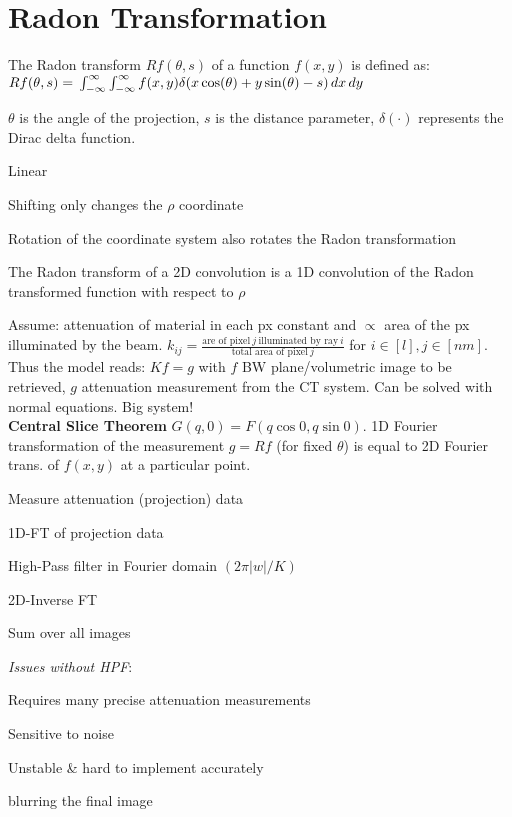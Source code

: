 \section{Radon Transformation}
The Radon transform $Rf(\theta, s)$ of a function $f(x, y)$ is defined as:\\
$
Rf(\theta, s) =\\
\int_{-\infty}^{\infty} \int_{-\infty}^{\infty} f(x, y) \delta(x\cos(\theta) + y\sin(\theta) - s) \,dx\,dy$

 $\theta$ is the angle of the projection, $ s $ is the distance parameter,
 $ \delta(\cdot) $ represents the Dirac delta function.


\begin{compactitem}
    \item Linear
    \item Shifting only changes the \(\rho\) coordinate
    \item Rotation of the coordinate system also rotates the Radon transformation
    \item The Radon transform of a 2D convolution is a 1D convolution of the Radon transformed function with respect to \(\rho\)
\end{compactitem}


  Assume: attenuation of material in each px constant and \(\propto\) area of the px illuminated by the beam.
  \(k_{ij} = \frac{\text{are of pixel} \ j \ \text{illuminated by ray} \ i}{\text{total area of pixel} \ j}\) for \(i \in [l], j \in [nm]\). Thus the model reads:
  \(Kf = g\) with \(f\) BW plane/volumetric image to be retrieved, \(g\) attenuation measurement from the CT system. Can be solved with normal equations. Big system! \\


\textbf{Central Slice Theorem}
  \(G(q, 0) = F(q \cos 0, q \sin 0)\). 1D Fourier transformation of the measurement \(g = Rf\) (for fixed \(\theta\)) is equal to 2D Fourier trans. of \(f(x, y)\) at a particular point. \\
\begin{compactenum}
    \item Measure attenuation (projection) data
    \item 1D-FT of projection data
    \item High-Pass filter in Fourier domain \((2 \pi |w| / K)\)
    \item 2D-Inverse FT
    \item Sum over all images
\end{compactenum}

\textit{Issues without HPF}:
  \begin{compactitem}
    \item Requires many precise attenuation measurements
    \item Sensitive to noise
    \item Unstable \& hard to implement accurately
    \item blurring the final image
  \end{compactitem}